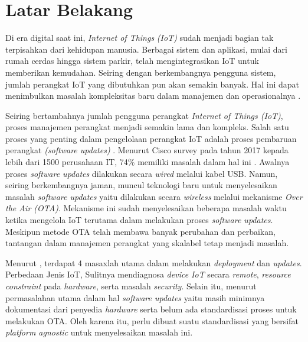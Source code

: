 \section{Latar Belakang}
\label{sec:latar-belakang}

Di era digital saat ini, \textit{Internet of Things} \textit{(IoT)} sudah menjadi bagian tak terpisahkan dari kehidupan manusia. Berbagai sistem dan aplikasi, mulai dari rumah cerdas hingga sistem parkir, telah mengintegrasikan IoT untuk memberikan kemudahan. Seiring dengan berkembangnya pengguna sistem, jumlah perangkat IoT yang dibutuhkan pun akan semakin banyak. Hal ini dapat menimbulkan masalah kompleksitas baru dalam manajemen dan operasionalnya \parencite{IOTSmartCity}.

Seiring bertambahnya jumlah pengguna perangkat \textit{Internet of Things (IoT)}, proses manajemen perangkat menjadi semakin lama dan kompleks. Salah satu proses yang penting dalam pengelolaan perangkat IoT adalah proses pembaruan perangkat \textit{(software updates)} \parencite{OTAKeyPrinciples}. Menurut Cisco survey pada tahun 2017 kepada lebih dari 1500 perusahaan IT, 74\% memiliki masalah dalam hal ini \parencite{RemoteDeployment}. Awalnya proses \textit{software updates} dilakukan secara \textit{wired} melalui kabel USB. Namun, seiring berkembangnya jaman, muncul teknologi baru untuk menyelesaikan masalah \textit{software updates} yaitu dilakukan secara \textit{wireless} melalui mekanisme \textit{Over the Air (OTA)}. Mekanisme ini sudah menyelesaikan beberapa masalah waktu ketika mengelola IoT terutama dalam melakukan proses \textit{software updates}. Meskipun metode OTA telah membawa banyak perubahan dan perbaikan, tantangan dalam manajemen perangkat yang skalabel tetap menjadi masalah. \parencite{ElJaouhari2022}

Menurut \parencite{RemoteDeployment}, terdapat 4 masaxlah utama dalam melakukan \textit{deployment} dan \textit{updates}. Perbedaan Jenis IoT, Sulitnya mendiagnosa \textit{device IoT} secara \textit{remote}, \textit{resource constraint} pada \textit{hardware}, serta masalah \textit{security}. Selain itu, menurut \parencite{studyovertheair1} permasalahan utama dalam hal \textit{software updates} yaitu masih minimnya dokumentasi dari penyedia \textit{hardware} serta belum ada standardisasi proses untuk melakukan OTA. Oleh karena itu, perlu dibuat suatu standardisasi yang bersifat \textit{platform agnostic} untuk menyelesaikan masalah ini.

